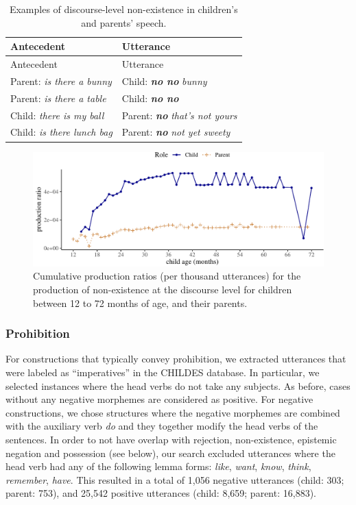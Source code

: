 \documentclass[
  man,floatsintext]{apa6}
\begin{document}
\begin{longtable}[]{@{}ll@{}}
\caption{\label{tab:disexist} Examples of discourse-level non-existence in children's and parents' speech.}\tabularnewline
\toprule\noalign{}
Antecedent & Utterance \\
\midrule\noalign{}
\endfirsthead
\toprule\noalign{}
Antecedent & Utterance \\
\midrule\noalign{}
\endhead
\bottomrule\noalign{}
\endlastfoot
Parent: \emph{is there a bunny} & Child: \textbf{\emph{no no}} \emph{bunny} \\
Parent: \emph{is there a table} & Child: \textbf{\emph{no no}} \\
Child: \emph{there is my ball} & Parent: \textbf{\emph{no}} \emph{that's not yours} \\
Child: \emph{is there lunch bag} & Parent: \textbf{\emph{no}} \emph{not yet sweety} \\
\end{longtable}

\begin{figure}[H]

{\centering \includegraphics{neg_construction_article_files/figure-latex/existencediscourse-1} 

}

\caption{Cumulative production ratios (per thousand utterances) for the production of non-existence at the discourse level for children between 12 to 72 months of age, and their parents.}\label{fig:existencediscourse}
\end{figure}

\hypertarget{prohibition}{%
\subsubsection{Prohibition}\label{prohibition}}

For constructions that typically convey prohibition, we extracted utterances that were labeled as ``imperatives'' in the CHILDES database. In particular, we selected instances where the head verbs do not take any subjects. As before, cases without any negative morphemes are considered as positive. For negative constructions, we chose structures where the negative morphemes are combined with the auxiliary verb \emph{do} and they together modify the head verbs of the sentences. In order to not have overlap with rejection, non-existence, epistemic negation and possession (see below), our search excluded utterances where the head verb had any of the following lemma forms: \emph{like}, \emph{want}, \emph{know}, \emph{think}, \emph{remember}, \emph{have}. This resulted in a total of 1,056 negative utterances (child: 303; parent: 753), and 25,542 positive utterances (child: 8,659; parent: 16,883).
\end{document}
